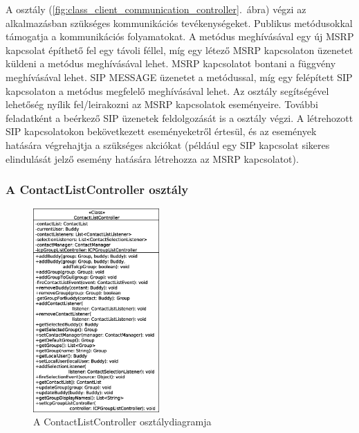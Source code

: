 A  osztály (\ref{fig:class_client_communication_controller}.~ábra) végzi az alkalmazásban szükséges kommunikációs tevékenységeket. Publikus metódusokkal támogatja a kommunikációs folyamatokat. A  metódus meghívásával egy új MSRP kapcsolat építhető fel egy távoli féllel, míg egy létező MSRP kapcsolaton üzenetet küldeni a  metódus meghívásával lehet. MSRP kapcsolatot bontani a  függvény meghívásával lehet. SIP MESSAGE üzenetet a  metódussal, míg egy felépített SIP kapcsolaton a  metódus megfelelő meghívásával lehet. Az osztály segítségével lehetőség nyílik fel/leirakozni az MSRP kapcsolatok eseményeire. További feladatként a beérkező SIP üzenetek feldolgozását is a  osztály végzi. A létrehozott SIP kapcsolatokon bekövetkezett eseményeketről értesül, és az események hatására végrehajtja a szükséges akciókat (például egy SIP kapcsolat sikeres elindulását jelző esemény hatására létrehozza az MSRP kapcsolatot).

\subsubsection*{A ContactListController osztály}
\label{sec:client_contactlistcontroller}

\begin{figure}
  \vspace{-15pt}
  \begin{center}
    \includegraphics[width=0.43\textwidth]{img/class_diagrams/client/eps/ContactListController.eps}
  \end{center}
  \vspace{-15pt}
  \captionsetup{font=scriptsize}
  \caption{A ContactListController osztálydiagramja}
   \label{fig:class_client_contactlistcontroller}
  \vspace{-10pt}
\end{figure}

